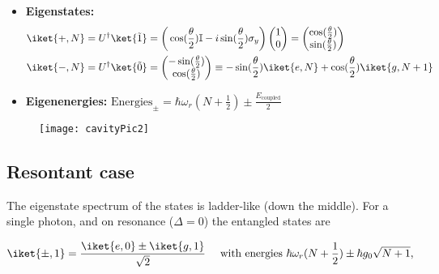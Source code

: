 \begin{enumerate}
\begin{framed}
    \begin{itemize}
    \item \textbf{Eigenstates:}
      \[
        \begin{aligned}
          \iket{+,N} & = U^{\dagger}\ket{\tilde{1}}
          =
          \bigg(\cos(\frac{\theta}{2})\mathbb{I}-i\sin(\frac{\theta}{2})\sigma_y\bigg)
          \begin{pmatrix}1\\0 \end{pmatrix} =
          \begin{pmatrix} \cos(\frac{\theta}{2})\\\sin(\frac{\theta}{2})\end{pmatrix} \\
          \iket{-,N} & = U^{\dagger}\ket{\tilde{0}}
          =                   \begin{pmatrix}
            -\sin(\frac{\theta}{2})\\\cos(\frac{\theta}{2})
          \end{pmatrix} \equiv -\sin(\frac{\theta}{2})\iket{e,N} + \cos(\frac{\theta}{2})\iket{g,N+1}\\
        \end{aligned}
      \]
    \item    \textbf{Eigenenergies:}   \hfill
      $        \text{Energies}_{\pm}        =
      \hbar\omega_r(N+\frac{1}{2})        \pm
      \frac{E_\text{coupled}}{2} $
    \end{itemize}
  \end{framed}

\end{enumerate}

\begin{figure}[h]
  \centering
  \texttt{[image: cavityPic2]}
\end{figure}

\subsection{Resontant case}
\label{sec:resontant-case}



\noindent  The  eigenstate  spectrum  of  the
 states is  ladder-like (down the
middle).   For   a  single  photon,   and  on
resonance ($  \Delta =  0 $) the  entangled states
are

 \[
   \iket{\pm,1}   =    \frac{\iket{e,0}   \pm
     \iket{g,1}}{\sqrt{2}}   \quad  \text{   with
     energies  } \hbar\omega_r(N+\frac{1}{2})
   \pm \hbar g_0\sqrt{N+1},
 \]

